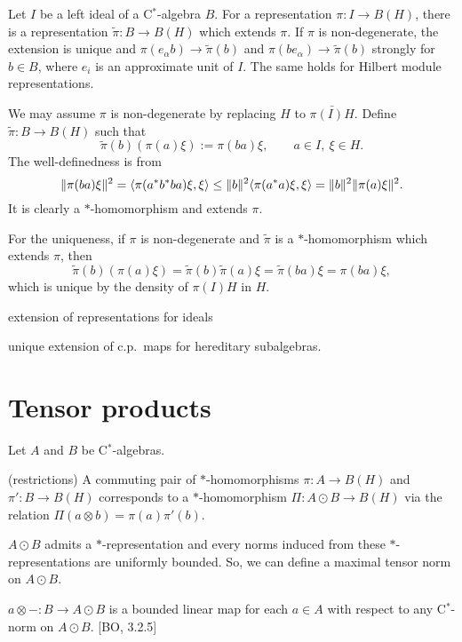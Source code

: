 \documentclass{../../large}
\begin{document}
\begin{prb}
Let $I$ be a left ideal of a C$^*$-algebra $B$.
For a representation $\pi:I\to B(H)$, there is a representation $\tilde\pi:B\to B(H)$ which extends $\pi$.
If $\pi$ is non-degenerate, the extension is unique and $\pi(e_\alpha b)\to\tilde\pi(b)$ and $\pi(be_\alpha)\to\tilde\pi(b)$ strongly for $b\in B$, where $e_i$ is an approximate unit of $I$.
The same holds for Hilbert module representations.
\end{prb}
\begin{pf}
We may assume $\pi$ is non-degenerate by replacing $H$ to $\bar{\pi(I)H}$.
Define $\tilde\pi:B\to B(H)$ such that
\[\tilde\pi(b)(\pi(a)\xi):=\pi(ba)\xi,\qquad a\in I,\ \xi\in H.\]
The well-definedness is from
\[\|\pi(ba)\xi\|^2=\langle\pi(a^*b^*ba)\xi,\xi\rangle\le\|b\|^2\langle\pi(a^*a)\xi,\xi\rangle=\|b\|^2\|\pi(a)\xi\|^2.\]
It is clearly a $*$-homomorphism and extends $\pi$.

For the uniqueness, if $\pi$ is non-degenerate and $\tilde\pi$ is a $*$-homomorphism which extends $\pi$, then
\[\tilde\pi(b)(\pi(a)\xi)=\tilde\pi(b)\tilde\pi(a)\xi=\tilde\pi(ba)\xi=\pi(ba)\xi,\]
which is unique by the density of $\pi(I)H$ in $H$.
\end{pf}

extension of representations for ideals

unique extension of c.p.~maps for hereditary subalgebras.






\section{Tensor products}

\begin{prb}
Let $A$ and $B$ be C$^*$-algebras.
\begin{parts}
\item (restrictions) A commuting pair of $*$-homomorphisms $\pi:A\to B(H)$ and $\pi':B\to B(H)$ corresponds to a $*$-homomorphism $\Pi:A\odot B\to B(H)$ via the relation $\Pi(a\otimes b)=\pi(a)\pi'(b)$.
\item $A\odot B$ admits a $*$-representation and every norms induced from these $*$-representations are uniformly bounded. So, we can define a maximal tensor norm on $A\odot B$.
\item $a\otimes-:B\to A\odot B$ is a bounded linear map for each $a\in A$ with respect to any C$^*$-norm on $A\odot B$. [BO, 3.2.5]
\end{parts}
\end{prb}
\end{document}
